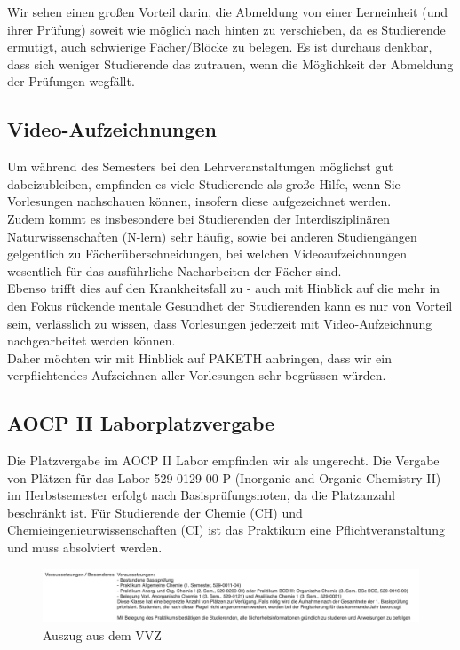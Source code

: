 \documentclass{article}
\begin{document}
Wir sehen einen großen Vorteil darin, die Abmeldung von einer Lerneinheit (und ihrer Prüfung) soweit wie möglich nach hinten zu verschieben, da es Studierende ermutigt, auch schwierige Fächer/Blöcke zu belegen. Es ist durchaus denkbar, dass sich weniger Studierende das zutrauen, wenn die Möglichkeit der Abmeldung der Prüfungen wegfällt. 

\subsection{Video-Aufzeichnungen}
Um während des Semesters bei den Lehrveranstaltungen möglichst gut dabeizubleiben, empfinden es viele Studierende als große Hilfe, wenn Sie Vorlesungen nachschauen können, insofern diese aufgezeichnet werden.\\
Zudem kommt es insbesondere bei Studierenden der Interdisziplinären Naturwissenschaften (N-lern) sehr häufig, sowie bei anderen Studiengängen gelgentlich zu Fächerüberschneidungen, bei welchen Videoaufzeichnungen wesentlich für das ausführliche Nacharbeiten der Fächer sind.\\ 
Ebenso trifft dies auf den Krankheitsfall zu - auch mit Hinblick auf die mehr in den Fokus rückende mentale Gesundhet der Studierenden kann es nur von Vorteil sein, verlässlich zu wissen, dass Vorlesungen jederzeit mit Video-Aufzeichnung nachgearbeitet werden können. \\ 
Daher möchten wir mit Hinblick auf PAKETH anbringen, dass wir ein verpflichtendes Aufzeichnen aller Vorlesungen sehr begrüssen würden.

\subsection{AOCP II Laborplatzvergabe}
Die Platzvergabe im AOCP II Labor empfinden wir als ungerecht. Die Vergabe von Plätzen für das Labor 529-0129-00 P (Inorganic and Organic Chemistry II) im Herbstsemester erfolgt nach Basisprüfungsnoten, da die Platzanzahl beschränkt ist. Für Studierende der Chemie (CH) und Chemieingenieurwissenschaften (CI) ist das Praktikum eine Pflichtveranstaltung und muss absolviert werden. 

\begin{figure}[H]
    \centering
    \includegraphics[width=1.05\linewidth]{Graphics/Screenshot 2025-03-11 at 16.18.40.png}
    \caption{Auszug aus dem VVZ}
    \label{fig:enter-label}
\end{figure}
\end{document}
